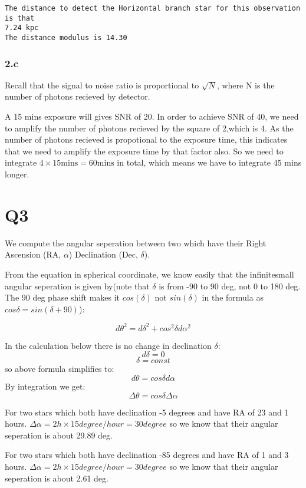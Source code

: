 \documentclass[11pt]{article}
\begin{document}
    \begin{Verbatim}[commandchars=\\\{\}]
The distance to detect the Horizontal branch star for this observation is that
7.24 kpc
The distance modulus is 14.30
\end{Verbatim}

    \hypertarget{c}{%
\subsubsection{2.c}\label{c}}

Recall that the signal to noise ratio is proportional to \(\sqrt{N}\),
where N is the number of photons recieved by detector.

A 15 mins exposure will gives SNR of 20. In order to achieve SNR of 40,
we need to amplify the number of photons recieved by the square of
2,which is 4. As the number of photons recieved is propotional to the
exposure time, this indicates that we need to amplify the exposure time
by that factor also. So we need to integrate
\(4 \times 15 \text{mins} = 60 \text{mins}\) in total, which means we
have to integrate 45 mins longer.

    \hypertarget{q3}{%
\section{Q3}\label{q3}}

    We compute the angular seperation between two which have their Right
Ascension (RA, \(\alpha\)) Declination (Dec, \(\delta\)).

From the equation in spherical coordinate, we know easily that the
infinitesmall angular seperation is given by(note that \(\delta\) is
from -90 to 90 deg, not 0 to 180 deg. The 90 deg phase shift makes it
\(cos(\delta)\) not \(sin(\delta)\) in the formula as
\(cos\delta = sin(\delta+90)\)):

\[d\theta^2 = d\delta^2+ cos^2\delta d\alpha^2 \]

In the calculation below there is no change in declination \(\delta\):
\[d\delta = 0\] \[\delta = const\] so above formula simplifies to:
\[d\theta = cos\delta d\alpha\] By integration we get:
\[\Delta \theta = cos\delta \Delta \alpha\]

For two stars which both have declination -5 degrees and have RA of 23
and 1 hours. \(\Delta \alpha = 2h \times 15 degree/hour = 30 degree\) so
we know that their angular seperation is about 29.89 deg.

For two stars which both have declination -85 degrees and have RA of 1
and 3 hours. \(\Delta \alpha = 2h \times 15 degree/hour = 30 degree\) so
we know that their angular seperation is about 2.61 deg.
\end{document}
